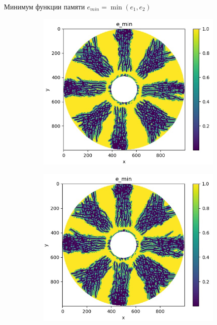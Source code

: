 \documentclass{beamer}
\begin{document}
\begin{frame}{Минимум функции памяти $e_{min} = \min(e_1,e_2)$}
\begin{figure}[H]
	\begin{subfigure}[H]{0.4\textwidth}
		\includegraphics[width=\textwidth]{e_2tf}
	\end{subfigure}
	\qquad\qquad
	\begin{subfigure}[H]{0.4\textwidth}
		\includegraphics[width=\textwidth]{e_tf}
	\end{subfigure}	
\end{figure}		
\end{frame}
	
\end{document}
